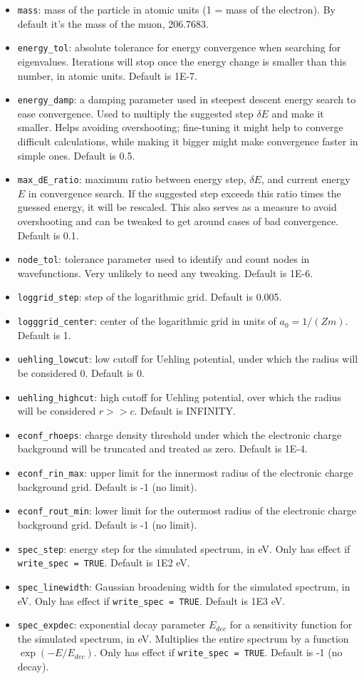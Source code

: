 \documentclass[]{article}
\begin{document}
\begin{itemize}
	\item \texttt{mass}: mass of the particle in atomic units (1 = mass of the electron). By default it's the mass of the muon, 206.7683.
	\item \texttt{energy\_tol}: absolute tolerance for energy convergence when searching for eigenvalues. Iterations will stop once the energy change is smaller than this number, in atomic units. Default is 1E-7.
	\item \texttt{energy\_damp}: a damping parameter used in steepest descent energy search to ease convergence. Used to multiply the suggested step $\delta E$ and make it smaller. Helps avoiding overshooting; fine-tuning it might help to converge difficult calculations, while making it bigger might make convergence faster in simple ones. Default is 0.5.
	\item \texttt{max\_dE\_ratio}: maximum ratio between energy step, $\delta E$, and current energy $E$ in convergence search. If the suggested step exceeds this ratio times the guessed energy, it will be rescaled. This also serves as a measure to avoid overshooting and can be tweaked to get around cases of bad convergence. Default is 0.1.
	\item \texttt{node\_tol}: tolerance parameter used to identify and count nodes in wavefunctions. Very unlikely to need any tweaking. Default is 1E-6.
	\item \texttt{loggrid\_step}: step of the logarithmic grid. Default is 0.005.
	\item \texttt{logggrid\_center}: center of the logarithmic grid in units of $a_0 = 1/(Zm)$. Default is 1.
	\item \texttt{uehling\_lowcut}: low cutoff for Uehling potential, under which the radius will be considered 0. Default is 0.
	\item \texttt{uehling\_highcut}: high cutoff for Uehling potential, over which the radius will be considered $r >> c$. Default is INFINITY.
	\item \texttt{econf\_rhoeps}: charge density threshold under which the electronic charge background will be truncated and treated as zero. Default is 1E-4.
	\item \texttt{econf\_rin\_max}: upper limit for the innermost radius of the electronic charge background grid. Default is -1 (no limit).
	\item \texttt{econf\_rout\_min}: lower limit for the outermost radius of the electronic charge background grid. Default is -1 (no limit).
	\item \texttt{spec\_step}: energy step for the simulated spectrum, in eV. Only has effect if \texttt{write\_spec = TRUE}. Default is 1E2 eV.
	\item \texttt{spec\_linewidth}: Gaussian broadening width for the simulated spectrum, in eV. Only has effect if \texttt{write\_spec = TRUE}. Default is 1E3 eV.
	\item \texttt{spec\_expdec}: exponential decay parameter $E_{dec}$ for a sensitivity function for the simulated spectrum, in eV. Multiplies the entire spectrum by a function $\exp(-E/E_{dec})$. Only has effect if \texttt{write\_spec = TRUE}. Default is -1 (no decay).
\end{itemize}
\end{document}
